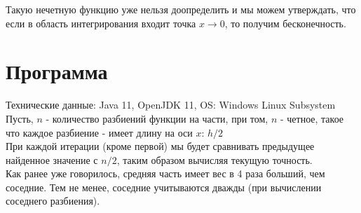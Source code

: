 \documentclass[11pt, english]{article}
\begin{document}
Такую нечетную функцию уже нельзя доопределить и мы можем утверждать, что если в область интегрирования входит точка $x \rightarrow 0$, то получим бесконечность. 


\section{Программа}

Технические данные: Java 11, OpenJDK 11, OS: Windows Linux Subsystem \\

Пусть, $n$ - количество разбиений функции на части, при том, $n$ - четное, такое что каждое разбиение - имеет длину на оси $x$: $h/2$\\

При каждой итерации (кроме первой) мы будет сравнивать предыдущее найденное значение с $n/2$, таким образом вычисляя текущую точность.\\

Как ранее уже говорилось, средняя часть имеет вес в 4 раза больший, чем соседние. Тем не менее, соседние учитываются дважды (при вычислении соседнего разбиения).\\
\end{document}

